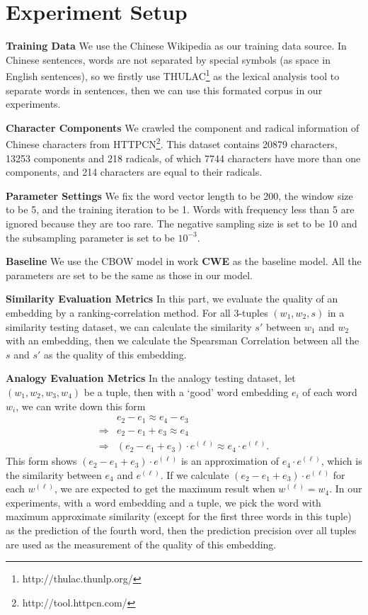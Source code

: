 
\section{Experiment Setup}

\textbf{Training Data} We use the Chinese Wikipedia as our training data source. In Chinese sentences, words are not separated by special symbols (as space in English sentences), so we firstly use THULAC\footnote{http://thulac.thunlp.org/} as the lexical analysis tool to separate words in sentences, then we can use this formated corpus in our experiments.

\textbf{Character Components} We crawled the component and radical information of Chinese characters from HTTPCN\footnote{http://tool.httpcn.com/}. This dataset contains 20879 characters, 13253 components and 218 radicals, of which 7744 characters have more than one components, and 214 characters are equal to their radicals.

\textbf{Parameter Settings} We fix the word vector length to be 200, the window size to be 5, and the training iteration to be 1. Words with frequency less than 5 are ignored because they are too rare. The negative sampling size is set to be 10 and the subsampling parameter is set to be $10^{-3}$.

\textbf{Baseline} We use the CBOW model in work \textbf{CWE} as the baseline model. All the parameters are set to be the same as those in our model.

\textbf{Similarity Evaluation Metrics} In this part, we evaluate the quality of an embedding by a ranking-correlation method. For all 3-tuples $(w_1, w_2, s)$ in a similarity testing dataset, we can calculate the similarity $s'$ between $w_1$ and $w_2$ with an embedding, then we calculate the Spearsman Correlation between all the $s$ and $s'$ as the quality of this embedding.

\textbf{Analogy Evaluation Metrics} In the analogy testing dataset, let $(w_1, w_2, w_3, w_4)$ be a tuple, then with a `good' word embedding $e_i$ of each word $w_i$, we can write down this form
\begin{align*}
	& e_2 - e_1 \approx e_4 - e_3 \\
	\Rightarrow & e_2 - e_1 + e_3 \approx e_4 \\
	\Rightarrow & (e_2 - e_1 + e_3)\cdot e^{(\ell)} \approx e_4\cdot e^{(\ell)}.
\end{align*}
This form shows $(e_2 - e_1 + e_3)\cdot e^{(\ell)}$ is an approximation of $e_4\cdot e^{(\ell)}$, which is the similarity between $e_4$ and $e^{(\ell)}$. If we calculate $(e_2 - e_1 + e_3)\cdot e^{(\ell)}$ for each $w^{(\ell)}$, we are expected to get the maximum result when $w^{(\ell)}=w_4$. In our experiments, with a word embedding and a tuple, we pick the word with maximum approximate similarity (except for the first three words in this tuple) as the prediction of the fourth word, then the prediction precision over all tuples are used as the measurement of the quality of this embedding.
